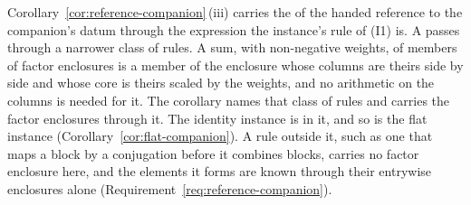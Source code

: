 
Corollary~\ref{cor:reference-companion}\,(iii) carries the
 of the handed reference to
the companion's datum through the expression the instance's rule of (I1) is.
A  passes through a narrower class of rules. A sum, with non-negative weights, of members of
factor enclosures is a member of the enclosure whose columns are theirs side
by side and whose core is theirs scaled by the weights, and no arithmetic on
the columns is needed for it. The corollary names that class of rules and
carries the factor enclosures through it. The identity instance is in it, and
so is the flat instance (Corollary~\ref{cor:flat-companion}). A rule outside
it, such as one that maps a block by a conjugation before it combines blocks,
carries no factor enclosure here, and the elements it forms are known
through their entrywise enclosures alone
(Requirement~\ref{req:reference-companion}).

